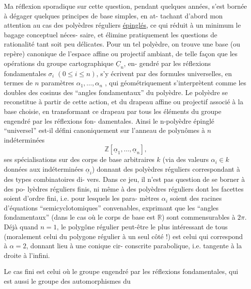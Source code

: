
Ma réflexion sporadique sur cette question, pendant quelques années,
s'est bornée à dégager quelques principes de base simples, en at-%
tachant d'abord mon attention au cas des polyèdres réguliers
\uline{épinglés}, ce qui réduit à un minimum le bagage conceptuel néces-%
saire, et élimine pratiquement les questions de rationalité tant
soit peu délicates. Pour un tel polyèdre, on trouve une base (ou
repère) canonique de l'espace affine ou projectif ambiant, de
telle façon que les opérations du groupe cartographique $\underline{C}_n$, en-%
gendré par les réflexions fondamentales $\sigma_i$ $(0 \leq i \leq n)$, s'y
écrivent par des formules universelles, en termes de $n$ paramètres
$\alpha_1,\ldots,\alpha_n$ , qui géométriquement s'interprètent comme les doubles
des cosinus des ``angles fondamentaux'' du polyèdre. Le polyèdre se
reconstitue à partir de cette action, et du drapeau affine ou
projectif associé à la base choisie, en transformant ce drapeau
par tous les éléments du groupe engendré par les réflexions fon-%
damentales. Ainsi le n-polyèdre épinglé ``universel'' est-il défini
canoniquement sur l'anneau de polynômes à $n$ indéterminées
\[ \mathbb{Z}[\underline{\alpha}_1,\ldots,\underline{\alpha}_n] , \]
ses spécialisations sur des corps de base arbitraires $k$ (via
des valeurs $\alpha_i \in k$ données aux indéterminées $\underline{\alpha}_i$) donnant des
polyèdres réguliers correspondant à des types combinatoires di-%
vers. Dans ce jeu, il n'est pas question de se borner à des po-%
lyèdres réguliers finis, ni même à des polyèdres réguliers dont
les facettes soient d'ordre fini, i.e. pour lesquels les para-%
mètres $\alpha_i$ soient des racines d'équations ``semicyclotomiques''
convenables, exprimant que les ``angles fondamentaux'' (dans le
cas où le corps de base est $\mathbb{R}$) sont commensurables à $2\pi$. Déjà
quand $n = 1$, le polygône régulier peut-être le plus intéressant
de tous (moralement celui du polygone régulier à un seul côté !)
est celui qui correspond à $\alpha = 2$, donnant lieu à une conique cir-%
conscrite parabolique, i.e. tangente à la droite à l'infini.

Le cas fini est celui où le groupe engendré par les réflexions
fondamentales, qui est aussi le groupe des automorphismes du


